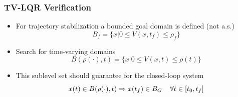 \documentclass{beamer}
\begin{document}
\begin{frame}
\frametitle{TV-LQR Verification}
\begin{itemize}
\item For trajectory stabilization a bounded goal domain is defined (not a.s.)
\begin{equation*}
B_f=\{ x|0\leq V(x,t_f) \leq \rho_f \} 
\end{equation*} 
\item Search for time-varying domains 
\begin{equation*}
B(\rho (\cdot ), t)=\{ x|0\leq V(x,t) \leq \rho (t) \} 
\end{equation*} 
\item This sublevel set should guarantee for the closed-loop system
\begin{equation*}
x(t) \in B( \rho (\cdot ), t) \Rightarrow x(t_f) \in B_G \hspace{.4cm} \forall t \in [ t_0, t_f ]
\end{equation*}
\end{itemize}

\end{frame}

\end{document}
